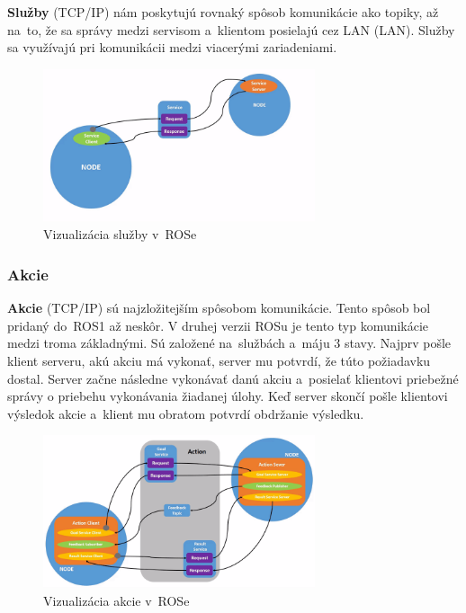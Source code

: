\textbf {Služby} (TCP/IP) nám poskytujú rovnaký spôsob komunikácie ako topiky, až na~to, že sa správy medzi servisom a~klientom posielajú
cez LAN (\acrlong{LAN}). Služby sa využívajú pri komunikácii medzi viacerými zariadeniami.

\begin{figure}[h]
	\centering
	\includegraphics[width=8cm]{img/serviceExplanation.png}
	\caption{Vizualizácia služby v~ROSe~\cite{RosDoc}}
	\label{fig:service}
\end{figure}

\subsubsection{Akcie}

\label{s_action}
\textbf {Akcie} (TCP/IP) sú najzložitejším spôsobom komunikácie. Tento spôsob bol pridaný do~ROS1 až neskôr. V druhej verzii ROSu je tento
typ komunikácie medzi troma základnými. Sú založené na~službách a~máju 3 stavy. Najprv pošle klient serveru, akú akciu má vykonať, server mu potvrdí,
že túto požiadavku dostal. Server začne následne vykonávať danú akciu a~posielať klientovi priebežné správy o priebehu vykonávania žiadanej úlohy.
Keď server skončí pošle klientovi výsledok akcie a~klient mu obratom potvrdí obdržanie výsledku.

\begin{figure}[h]
	\centering
	\includegraphics[width=8cm]{img/actionExplanation.png}
	\caption{Vizualizácia akcie v~ROSe~\cite{RosDoc}}
	\label{fig:action}
\end{figure}

